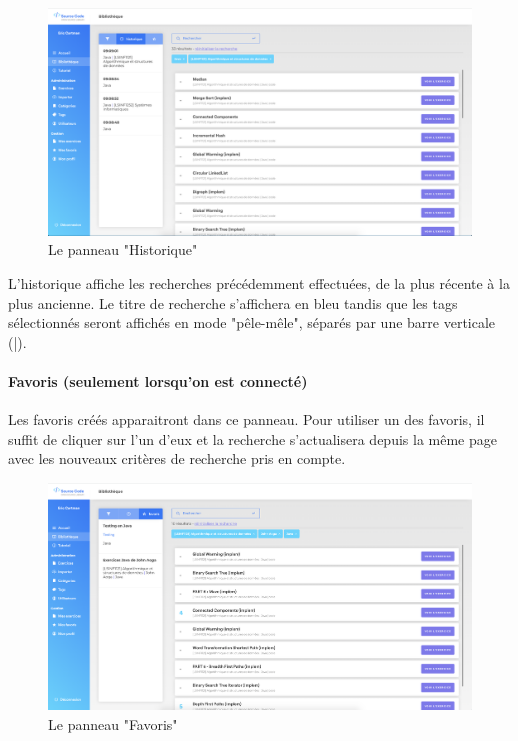 \begin{figure}[H]
    \includegraphics[width=\textwidth,height=\textheight,keepaspectratio]{images/client/historical.png}
    \centering
    \caption[SourceCode : le panneau "Historique"]{Le panneau "Historique"}
\end{figure}

L'historique affiche les recherches précédemment effectuées, de la plus récente à la plus ancienne. Le titre de recherche s'affichera en bleu tandis que les \glspl{tag} sélectionnés seront affichés en mode "pêle-mêle", séparés par une barre verticale (|).\\

\paragraph{Favoris (seulement lorsqu'on est connecté)} Les favoris créés apparaitront dans ce panneau. Pour utiliser un des favoris, il suffit de cliquer sur l'un d'eux et la recherche s'actualisera depuis la même page avec les nouveaux critères de recherche pris en compte.

\begin{figure}[H]
    \includegraphics[width=\textwidth,height=\textheight,keepaspectratio]{images/client/favorite-panel.png}
    \centering
    \caption[SourceCode : le panneau "Favoris"]{Le panneau "Favoris"}
\end{figure}

